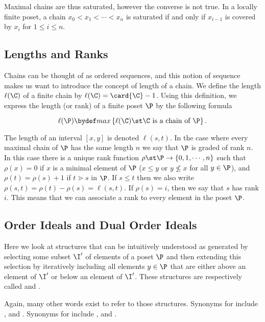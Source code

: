 Maximal chains are thus saturated, however the converse is not true. In a
locally finite poset, a chain $x_0 < x_1 < \cdots < x_n$ is saturated if and
only if $x_{i-1}$ is covered by $x_i$ for $1 \le i \le n$.


\subsection{Lengths and Ranks}

Chains can be thought of as ordered sequences, and this notion of sequence makes
us want to introduce the concept of length of a chain. We define the length
$\ell(\C)$ of a finite chain by $\ell(\C) = \card{\C} - 1$. Using this definition, we
express the length (or rank) of a finite poset $\P$ by the following formula

\begin{displaymath}
\ell(\P) \bydef max\left\{{\ell(\C) \st \C ~\text{is a chain of}~ \P}\right\}.
\end{displaymath}

The length of an interval $[x, y]$ is denoted $\ell(s, t)$. In the case where
every maximal chain of $\P$ has the same length $n$ we say that $\P$ is graded of
rank $n$. In this case there is a unique rank function $\rho \st \P \to \left\{{0,
1, \cdots , n}\right\}$ such that $\rho(x) = 0$ if $x$ is a minimal element of
$\P$ ($x \le y$ or $y \nleq x$ for all $y \in \P$), and $\rho(t) = \rho(s) + 1$
if $t \gtrdot s$ in $\P$. If $s \le t$ then we also write $\rho(s, t) = \rho(t)
- \rho(s) = \ell(s, t)$. If $\rho(s) = i$, then we say that $s$ has rank $i$.
This means that we can associate a rank to every element in the poset $\P$.


\subsection{Order Ideals and Dual Order Ideals}

Here we look at structures that can be intuitively understood as generated by
selecting some subset $\I'$ of elements of a poset $\P$ and then extending this
selection by iteratively including all elements $y \in \P$ that
are either above an element of $\I'$ or below an element of $\I'$. These
structures are respectively called  and .

Again, many other words exist to refer to those structures. Synonyms for
 include ,  and
. Synonyms for  include
,  and .

